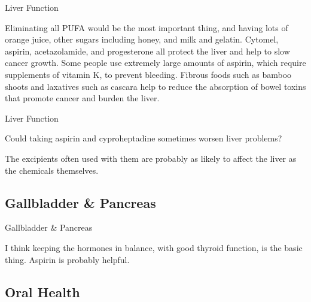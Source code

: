 \documentclass[11pt,oneside,openany,extrafontsizes]{memoir}
\begin{document}
\begin{standalonequote}{Liver Function}

    \begin{answer}
        Eliminating all PUFA would be the most important thing, and having lots of orange juice, other sugars including honey, and milk and gelatin. Cytomel, aspirin, acetazolamide, and progesterone all protect the liver and help to slow cancer growth. Some people use extremely large amounts of aspirin, which require supplements of vitamin K, to prevent bleeding. Fibrous foods such as bamboo shoots and laxatives such as cascara help to reduce the absorption of bowel toxins that promote cancer and burden the liver.
    \end{answer}
\end{standalonequote}

\begin{qaexchange}{Liver Function}

    \begin{question}
        Could taking aspirin and cyproheptadine sometimes worsen liver problems?
    \end{question}

    \begin{answer}
      The excipients often used with them are probably as likely to affect the liver as the chemicals themselves.
    \end{answer}
\end{qaexchange}

\subsection{Gallbladder \& Pancreas}

\begin{standalonequote}{Gallbladder \& Pancreas}

    \begin{answer}
       I think keeping the hormones in balance, with good thyroid function, is the basic thing. Aspirin is probably helpful.
    \end{answer}
\end{standalonequote}

\subsection{Oral Health}
\end{document}
